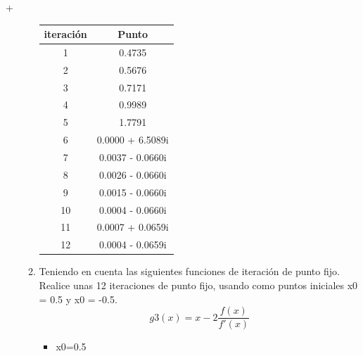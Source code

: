 +\documentclass{udpreport}
\begin{document}
\begin{enumerate}
\begin{enumerate}
\begin{table}[H]
\begin{tabular} { |c|c|}
        \hline
        iteración  &  Punto\\
        \hline
        1 &  0.4735       \\
         \hline
        2 &   0.5676     \\
         \hline
        3 &  0.7171
       \\
         \hline
        4 &   0.9989     \\
         \hline
        5 & 1.7791        \\
         \hline
        6 &  0.0000 + 6.5089i      \\
         \hline
        7 &   0.0037 - 0.0660i       \\
         \hline
        8 &     0.0026 - 0.0660i   \\
         \hline
        9 &   0.0015 - 0.0660i       \\
         \hline
        10 &    0.0004 - 0.0660i      \\
         \hline
        11 &    0.0007 + 0.0659i \\
         \hline
        12 &   0.0004 - 0.0659i       \\
        \hline
        
        \end{tabular}
        
    \end{table}
 \vspace{3cm}   
 \item Teniendo en cuenta las siguientes funciones de iteración de punto fijo.  Realice unas 12 iteraciones de punto fijo, usando como puntos iniciales x0 = 0.5 y x0 = -0.5.\\   
  \begin{equation}
 g3(x) = x-2\frac{f(x)}
{f'(x)}
\end{equation}
 \begin{itemize}
\item x0=0.5
\end{itemize}

\begin{table}[H]
    \centering
        \begin{tabular} { |c|c|}
        

\end{tabular}
\end{table}
\end{enumerate}
\end{enumerate}
\end{document}
